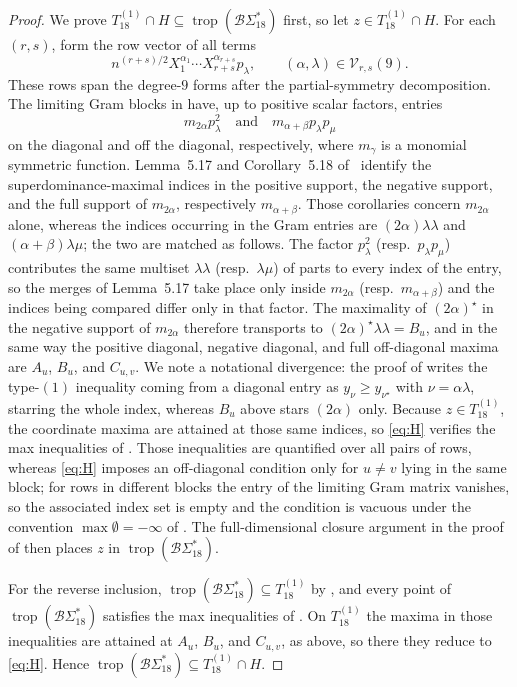 \documentclass[11pt]{amsart}
\DeclareMathOperator{\trop}{trop}
\newcommand{\BS}{\mathcal{B}\Sigma}
\begin{document}
\begin{proof}
We prove \(T_{18}^{(1)}\cap H\subseteq\trop(\BS_{18}^{*})\) first, so
let \(z\in T_{18}^{(1)}\cap H\).
For each \((r,s)\), form the row vector of all terms
\[
n^{(r+s)/2}X_1^{\alpha_1}\cdots
X_{r+s}^{\alpha_{r+s}}p_{\lambda},
\qquad
(\alpha,\lambda)\in\mathcal V_{r,s}(9).
\]
These rows span the degree-\(9\) forms after the partial-symmetry
decomposition. The limiting Gram blocks in
\cite[Section~5.3 and Appendix~A]{ABDR} have, up to positive scalar
factors, entries
\[
 m_{2\alpha}p_{\lambda}^{2}
 \quad\text{and}\quad
 m_{\alpha+\beta}p_{\lambda}p_{\mu}
\]
on the diagonal and off the diagonal, respectively, where \(m_\gamma\)
is a monomial symmetric function. Lemma~5.17 and Corollary~5.18
of~\cite{ABDR} identify the superdominance-maximal indices in the
positive support, the negative support, and the full support of
\(m_{2\alpha}\), respectively \(m_{\alpha+\beta}\). Those corollaries
concern \(m_{2\alpha}\) alone, whereas the indices occurring in the
Gram entries are \((2\alpha)\lambda\lambda\) and
\((\alpha+\beta)\lambda\mu\); the two are matched as follows. The
factor \(p_{\lambda}^{2}\) (resp.\ \(p_{\lambda}p_{\mu}\)) contributes
the same multiset \(\lambda\lambda\) (resp.\ \(\lambda\mu\)) of parts to
every index of the entry, so the merges of Lemma~5.17 take place only
inside \(m_{2\alpha}\) (resp.\ \(m_{\alpha+\beta}\)) and the indices
being compared differ only in that factor. The maximality of
\((2\alpha)^{\star}\) in the negative support of \(m_{2\alpha}\)
therefore transports to \((2\alpha)^{\star}\lambda\lambda=B_u\), and in
the same way the positive diagonal, negative diagonal, and full
off-diagonal maxima are \(A_u\), \(B_u\), and \(C_{u,v}\). We note a
notational divergence: the proof of \cite[Proposition~5.20]{ABDR}
writes the type-\((1)\) inequality coming from a diagonal entry as
\(y_{\nu}\ge y_{\nu^{\star}}\) with \(\nu=\alpha\lambda\), starring the
whole index, whereas \(B_u\) above stars \((2\alpha)\) only.
Because \(z\in T_{18}^{(1)}\), the coordinate maxima are attained at
those same indices, so \eqref{eq:H} verifies the max inequalities
of \cite[Lemma~5.14]{ABDR}. Those
inequalities are quantified over all pairs of rows, whereas
\eqref{eq:H} imposes an off-diagonal condition only for \(u\ne v\)
lying in the same block; for rows in different blocks the entry of the
limiting Gram matrix vanishes, so the associated index set is empty and
the condition is vacuous under the convention
\(\max\emptyset=-\infty\) of \cite[Lemma~5.14]{ABDR}. The
full-dimensional closure argument in the proof of
\cite[Proposition~5.19]{ABDR} then places \(z\) in
\(\trop(\BS_{18}^{*})\).

For the reverse inclusion, \(\trop(\BS_{18}^{*})\subseteq T_{18}^{(1)}\)
by \cite[Proposition~5.13]{ABDR}, and every point of
\(\trop(\BS_{18}^{*})\) satisfies the max inequalities
of \cite[Lemma~5.14]{ABDR}. On \(T_{18}^{(1)}\) the maxima in those
inequalities are attained at \(A_u\), \(B_u\), and \(C_{u,v}\), as
above, so there they reduce to \eqref{eq:H}. Hence
\(\trop(\BS_{18}^{*})\subseteq T_{18}^{(1)}\cap H\).
\end{proof}
\end{document}
